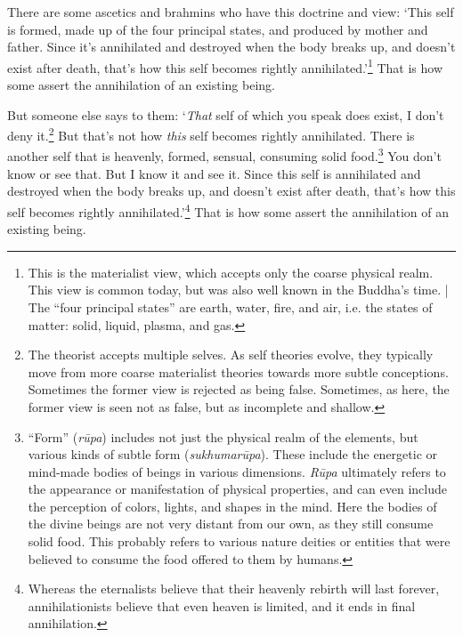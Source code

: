 \documentclass[12pt,openany]{book}%
\begin{document}
There are some ascetics and brahmins who have this doctrine and view: ‘This self is formed, made up of the four principal states, and produced by mother and father. Since it’s annihilated and destroyed when the body breaks up, and doesn’t exist after death, that’s how this self becomes rightly annihilated.’\footnote{This is the materialist view, which accepts only the coarse physical realm. This view is common today, but was also well known in the Buddha’s time. | The “four principal states” are earth, water, fire, and air, i.e. the states of matter: solid, liquid, plasma, and gas. } That is how some assert the annihilation of an existing being. 

But someone else says to them: ‘\emph{That} self of which you speak does exist, I don’t deny it.\footnote{The theorist accepts multiple selves. As self theories evolve, they typically move from more coarse materialist theories towards more subtle conceptions. Sometimes the former view is rejected as being false. Sometimes, as here, the former view is seen not as false, but as incomplete and shallow. } But that’s not how \emph{this} self becomes rightly annihilated. There is another self that is heavenly, formed, sensual, consuming solid food.\footnote{“Form” (\textit{\textsanskrit{rūpa}}) includes not just the physical realm of the elements, but various kinds of subtle form (\textit{\textsanskrit{sukhumarūpa}}). These include the energetic or mind-made bodies of beings in various dimensions. \textit{\textsanskrit{Rūpa}}  ultimately refers to the appearance or manifestation of physical properties, and can even include the perception of colors, lights, and shapes in the mind. Here the bodies of the divine beings are not very distant from our own, as they still consume solid food. This probably refers to various nature deities or entities that were believed to consume the food offered to them by humans. } You don’t know or see that. But I know it and see it. Since this self is annihilated and destroyed when the body breaks up, and doesn’t exist after death, that’s how this self becomes rightly annihilated.’\footnote{Whereas the eternalists believe that their heavenly rebirth will last forever, annihilationists believe that even heaven is limited, and it ends in final annihilation. } That is how some assert the annihilation of an existing being. 
\end{document}
